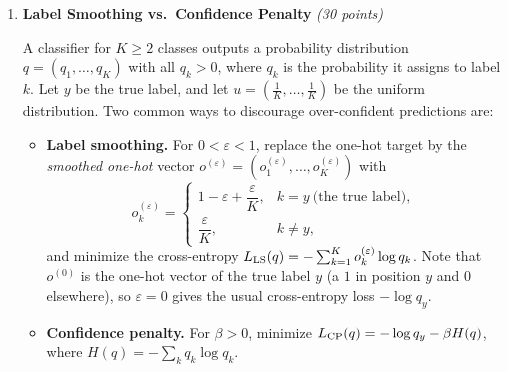 \documentclass[12pt]{article}
\begin{document}
\begin{enumerate}
\begin{solution}
\begin{enumerate}[a)]
\item Let $P(\tau\to\sigma)=P(X_{i+1}=\sigma\mid X_i=\tau)$ be the one-step transition probability between orderings and $U(\sigma)=\frac1{n!}$. We need $\sum_\tau U(\tau)P(\tau\to\sigma)=U(\sigma)$ for every ordering $\sigma$.
\begin{itemize}
\item From any ordering $\tau$, the $n$ insertion positions of the top card give $n$ \emph{different} orderings, each with probability $\frac1n$. So $P(\tau\to\sigma)\in\{0,\frac1n\}$.
\item Which $\tau$ can reach a fixed $\sigma$? Undo the move: pick any one of the $n$ cards of $\sigma$ and move it to the top. This gives exactly $n$ distinct predecessors $\tau$ (picking the top card of $\sigma$ gives $\tau=\sigma$, the ``reinsert on top'' move).
\end{itemize}
Therefore
\[
\sum_\tau U(\tau)P(\tau\to\sigma)=n\cdot\frac1{n!}\cdot\frac1n=\frac1{n!}=U(\sigma).
\]
(Equivalently, the transition matrix is doubly stochastic: every row and every column sums to 1, so the uniform distribution is stationary.)
\end{enumerate}
\end{solution}

\begin{problem}
\end{problem}
\newpage


\item {\bf Label Smoothing vs.\ Confidence Penalty} {\it (30 points)}

A classifier for $K\ge 2$ classes outputs a probability distribution $q=(q_1,\dots,q_K)$ with all $q_k>0$, where $q_k$ is the probability it assigns to label $k$. Let $y$ be the true label, and let $u=(\frac1K,\dots,\frac1K)$ be the uniform distribution. Two common ways to discourage over-confident predictions are:
\begin{itemize}
\item {\bf Label smoothing.} For $0<\varepsilon<1$, replace the one-hot target by the \emph{smoothed one-hot} vector $o^{(\varepsilon)}=(o^{(\varepsilon)}_1,\dots,o^{(\varepsilon)}_K)$ with
\[
o^{(\varepsilon)}_k=
\begin{cases}
1-\varepsilon+\dfrac{\varepsilon}{K}, & k=y \ \text{(the true label)},\\[2mm]
\dfrac{\varepsilon}{K}, & k\ne y,
\end{cases}
\]
and minimize the cross-entropy $L_{\rm LS}(q)=-\sum_{k=1}^K o^{(\varepsilon)}_k\log q_k$. Note that $o^{(0)}$ is the one-hot vector of the true label $y$ (a $1$ in position $y$ and $0$ elsewhere), so $\varepsilon=0$ gives the usual cross-entropy loss $-\log q_y$.
\item {\bf Confidence penalty.} For $\beta>0$, minimize $L_{\rm CP}(q)=-\log q_y-\beta H(q)$, where $H(q)=-\sum_k q_k\log q_k$.
\end{itemize}


\end{enumerate}
\end{document}
